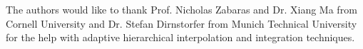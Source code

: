 The authors would like to thank Prof. Nicholas Zabaras and Dr. Xiang Ma from
Cornell University and Dr. Stefan Dirnstorfer from Munich Technical University
for the help with adaptive hierarchical interpolation and integration
techniques.
